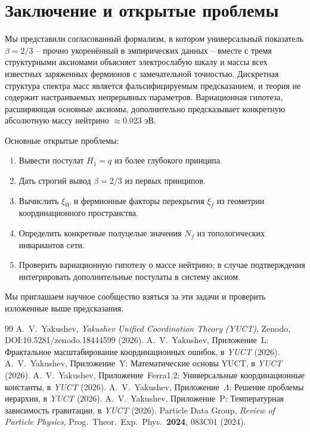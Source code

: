 \documentclass[11pt,a4paper]{article}
\begin{document}
	
	\section{Заключение и открытые проблемы}
	
	Мы представили согласованный формализм, в котором универсальный показатель \(\beta = 2/3\) – прочно укоренённый в эмпирических данных – вместе с тремя структурными аксиомами объясняет электрослабую шкалу и массы всех известных заряженных фермионов с замечательной точностью.  Дискретная структура спектра масс является фальсифицируемым предсказанием, и теория не содержит настраиваемых непрерывных параметров.  Вариационная гипотеза, расширяющая основные аксиомы, дополнительно предсказывает конкретную абсолютную массу нейтрино \(\approx 0.023\) эВ.
	
	Основные открытые проблемы:
	\begin{enumerate}[label=(\roman*)]
		\item Вывести постулат \(H_1 = q\) из более глубокого принципа.
		\item Дать строгий вывод \(\beta = 2/3\) из первых принципов.
		\item Вычислить \(\xi_W\) и фермионные факторы перекрытия \(\xi_f\) из геометрии координационного пространства.
		\item Определить конкретные полуцелые значения \(N_f\) из топологических инвариантов сети.
		\item Проверить вариационную гипотезу о массе нейтрино; в случае подтверждения интегрировать дополнительные постулаты в систему аксиом.
	\end{enumerate}
	Мы приглашаем научное сообщество взяться за эти задачи и проверить изложенные выше предсказания.
	
	\begin{thebibliography}{99}
		 A.~V.~Yakushev, \emph{Yakushev Unified Coordination Theory (YUCT)}, Zenodo, DOI:10.5281/zenodo.18444599 (2026).
		 A.~V.~Yakushev, Приложение~L: Фрактальное масштабирование координационных ошибок, в \emph{YUCT} (2026).
		 A.~V.~Yakushev, Приложение~Y: Математические основы YUCT, в \emph{YUCT} (2026).
		 A.~V.~Yakushev, Приложение~Ferra1.2: Универсальные координационные константы, в \emph{YUCT} (2026).
		 A.~V.~Yakushev, Приложение~\(\Lambda\): Решение проблемы иерархии, в \emph{YUCT} (2026).
		 A.~V.~Yakushev, Приложение~P: Температурная зависимость гравитации, в \emph{YUCT} (2026).
		 Particle Data Group, \emph{Review of Particle Physics}, Prog.\ Theor.\ Exp.\ Phys.\ \textbf{2024}, 083C01 (2024).
	\end{thebibliography}
	
\end{document}
